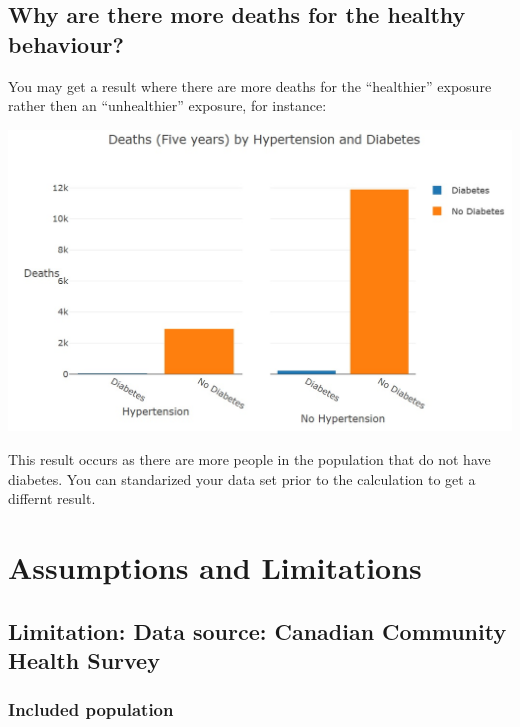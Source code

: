 \documentclass[]{book}
\begin{document}
\hypertarget{why-are-there-more-deaths-for-the-healthy-behaviour}{%
\subsection{Why are there more deaths for the healthy behaviour?}\label{why-are-there-more-deaths-for-the-healthy-behaviour}}

You may get a result where there are more deaths for the ``healthier'' exposure rather then an ``unhealthier'' exposure, for instance:

\begin{center}\includegraphics{Images/Graph-hypertension-diabetes} \end{center}

This result occurs as there are more people in the population that do not have diabetes. You can standarized your data set prior to the calculation to get a differnt result.

\hypertarget{assumptions-and-limitations}{%
\section{Assumptions and Limitations}\label{assumptions-and-limitations}}

\hypertarget{limitation-data-source-canadian-community-health-survey}{%
\subsection{Limitation: Data source: Canadian Community Health Survey}\label{limitation-data-source-canadian-community-health-survey}}

\hypertarget{included-population}{%
\subsubsection{Included population}\label{included-population}}
\end{document}
